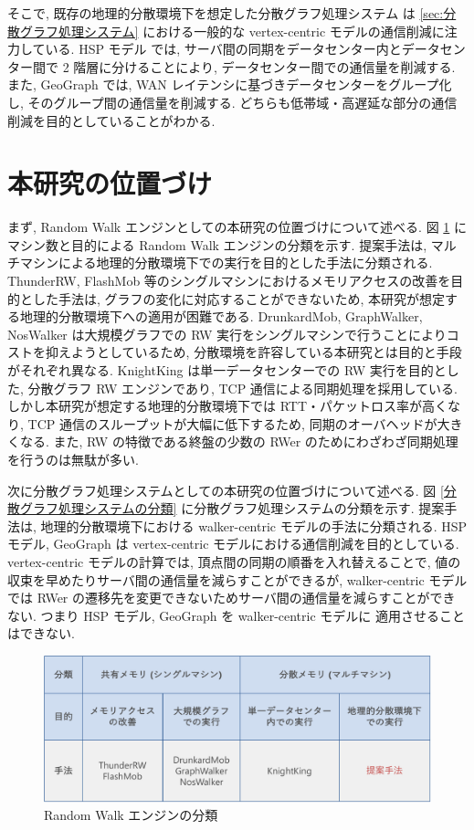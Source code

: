 そこで, 既存の地理的分散環境下を想定した分散グラフ処理システム\cite{10.5555/3277180.3277185}\cite{8486361}\cite{10.1145/3397271.3401157} は \ref{sec:分散グラフ処理システム} における一般的な vertex-centric モデルの通信削減に注力している. HSP モデル\cite{8486361} では, サーバ間の同期をデータセンター内とデータセンター間で 2 階層に分けることにより, データセンター間での通信量を削減する. また, GeoGraph\cite{10.1145/3397271.3401157} では, WAN レイテンシに基づきデータセンターをグループ化し, そのグループ間の通信量を削減する. どちらも低帯域・高遅延な部分の通信削減を目的としていることがわかる. 

\section{本研究の位置づけ}

まず, Random Walk エンジンとしての本研究の位置づけについて述べる. 図 \ref{Random Walk エンジンの分類} にマシン数と目的による Random Walk エンジンの分類を示す. 提案手法は, マルチマシンによる地理的分散環境下での実行を目的とした手法に分類される. ThunderRW, FlashMob 等のシングルマシンにおけるメモリアクセスの改善を目的とした手法は, グラフの変化に対応することができないため, 本研究が想定する地理的分散環境下への適用が困難である. DrunkardMob, GraphWalker, NosWalker は大規模グラフでの RW 実行をシングルマシンで行うことによりコストを抑えようとしているため, 分散環境を許容している本研究とは目的と手段がそれぞれ異なる. KnightKing は単一データセンターでの RW 実行を目的とした, 分散グラフ RW エンジンであり, TCP 通信による同期処理を採用している. しかし本研究が想定する地理的分散環境下では RTT・パケットロス率が高くなり, TCP 通信のスループットが大幅に低下するため, 同期のオーバヘッドが大きくなる. また, RW の特徴である終盤の少数の RWer のためにわざわざ同期処理を行うのは無駄が多い. 

次に分散グラフ処理システムとしての本研究の位置づけについて述べる. 図 \ref{分散グラフ処理システムの分類} に分散グラフ処理システムの分類を示す. 提案手法は, 地理的分散環境下における walker-centric モデルの手法に分類される. HSP モデル, GeoGraph は vertex-centric モデルにおける通信削減を目的としている. vertex-centric モデルの計算では, 頂点間の同期の順番を入れ替えることで, 値の収束を早めたりサーバ間の通信量を減らすことができるが, walker-centric モデルでは RWer の遷移先を変更できないためサーバ間の通信量を減らすことができない. つまり HSP モデル, GeoGraph を walker-centric モデルに 適用させることはできない. 

\begin{figure}[t]
    \centering
    \includegraphics[scale=0.5]{figure/RWEngine.pdf}
    \caption{Random Walk エンジンの分類}
    \label{Random Walk エンジンの分類}
\end{figure}

